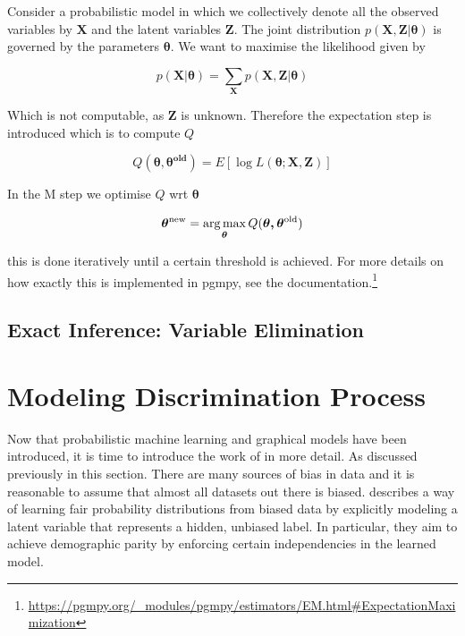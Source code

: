 Consider a probabilistic model in which we collectively denote all the observed
variables by $\boldsymbol{X}$ and the latent variables $\boldsymbol{Z}$. The joint distribution $p(\boldsymbol{X}, \boldsymbol{Z} | \boldsymbol{\theta})$ is governed by the parameters $\boldsymbol{\theta}$. We want to maximise the likelihood given by

\begin{equation*}
    p(\boldsymbol{X} | \boldsymbol{\theta}) = \sum_{\boldsymbol{X}} p(\boldsymbol{X}, \boldsymbol{Z} | \boldsymbol{\theta})
\end{equation*}

Which is not computable, as $\boldsymbol{Z}$ is unknown. Therefore the expectation step is introduced which is to compute $Q$

\begin{equation*}
    Q(\boldsymbol{\theta, \theta^{\text{old}}}) = E[\log L(\boldsymbol{\theta}; \boldsymbol{X}, \boldsymbol{Z})]
\end{equation*}

In the M step we optimise $Q$ wrt $\boldsymbol{\theta}$

\begin{equation*}
    \boldsymbol{\theta^{\text{new}}} = \operatorname*{arg\,max}_{\boldsymbol{\theta}} Q(\boldsymbol{\theta, \theta^{\text{old}}})
\end{equation*}

this is done iteratively until a certain threshold is achieved. For more details on how exactly this is implemented in pgmpy, see the documentation.\footnote{\url{https://pgmpy.org/_modules/pgmpy/estimators/EM.html\#ExpectationMaximization}}

\subsection{Exact Inference: Variable Elimination}
\label{Variable Elimination}


\section{Modeling Discrimination Process}
\label{sec:paper1}
Now that probabilistic machine learning and graphical models have been introduced, it is time to introduce the work of \citet{Choi:2021:AIII} in more detail. As discussed previously in this section. There are many sources of bias in data and it is reasonable to assume that almost all datasets out there is biased. \citet{Choi:2021:AIII} describes a way of learning fair probability distributions from biased data by explicitly modeling a latent variable that represents a hidden, unbiased label. In particular, they aim to achieve demographic parity by enforcing
certain independencies in the learned model.


